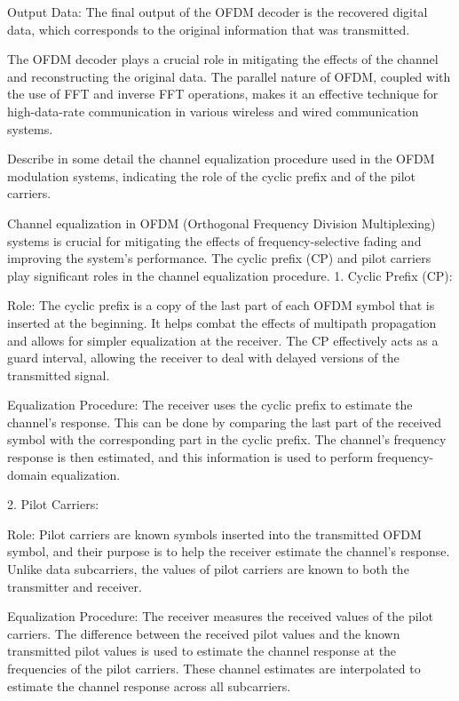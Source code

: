 Output Data:
The final output of the OFDM decoder is the recovered digital data, which corresponds to the original information that was transmitted.

The OFDM decoder plays a crucial role in mitigating the effects of the channel and reconstructing the original data. The parallel nature of OFDM, coupled with the use of FFT and inverse FFT operations, makes it an effective technique for high-data-rate communication in various wireless and wired communication systems.








Describe in some detail the channel equalization procedure used in the OFDM modulation systems, indicating the role of the cyclic prefix and of the pilot carriers.



Channel equalization in OFDM (Orthogonal Frequency Division Multiplexing) systems is crucial for mitigating the effects of frequency-selective fading and improving the system's performance. The cyclic prefix (CP) and pilot carriers play significant roles in the channel equalization procedure.
1. Cyclic Prefix (CP):

Role: The cyclic prefix is a copy of the last part of each OFDM symbol that is inserted at the beginning. It helps combat the effects of multipath propagation and allows for simpler equalization at the receiver. The CP effectively acts as a guard interval, allowing the receiver to deal with delayed versions of the transmitted signal.

Equalization Procedure:
The receiver uses the cyclic prefix to estimate the channel's response. This can be done by comparing the last part of the received symbol with the corresponding part in the cyclic prefix.
The channel's frequency response is then estimated, and this information is used to perform frequency-domain equalization.

2. Pilot Carriers:

Role: Pilot carriers are known symbols inserted into the transmitted OFDM symbol, and their purpose is to help the receiver estimate the channel's response. Unlike data subcarriers, the values of pilot carriers are known to both the transmitter and receiver.

Equalization Procedure:
The receiver measures the received values of the pilot carriers.
The difference between the received pilot values and the known transmitted pilot values is used to estimate the channel response at the frequencies of the pilot carriers.
These channel estimates are interpolated to estimate the channel response across all subcarriers.

